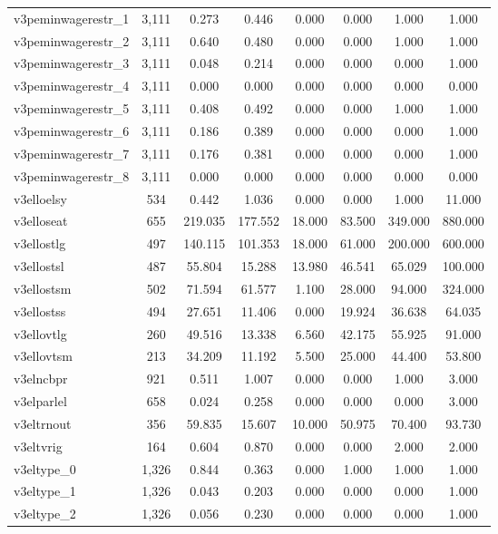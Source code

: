 \begin{table}[!htbp]
\begin{tabular}{@{\extracolsep{5pt}}lccccccc}
v3peminwagerestr\_1 & 3,111 & 0.273 & 0.446 & 0.000 & 0.000 & 1.000 & 1.000 \\ 
v3peminwagerestr\_2 & 3,111 & 0.640 & 0.480 & 0.000 & 0.000 & 1.000 & 1.000 \\ 
v3peminwagerestr\_3 & 3,111 & 0.048 & 0.214 & 0.000 & 0.000 & 0.000 & 1.000 \\ 
v3peminwagerestr\_4 & 3,111 & 0.000 & 0.000 & 0.000 & 0.000 & 0.000 & 0.000 \\ 
v3peminwagerestr\_5 & 3,111 & 0.408 & 0.492 & 0.000 & 0.000 & 1.000 & 1.000 \\ 
v3peminwagerestr\_6 & 3,111 & 0.186 & 0.389 & 0.000 & 0.000 & 0.000 & 1.000 \\ 
v3peminwagerestr\_7 & 3,111 & 0.176 & 0.381 & 0.000 & 0.000 & 0.000 & 1.000 \\ 
v3peminwagerestr\_8 & 3,111 & 0.000 & 0.000 & 0.000 & 0.000 & 0.000 & 0.000 \\ 
v3elloelsy & 534 & 0.442 & 1.036 & 0.000 & 0.000 & 1.000 & 11.000 \\ 
v3elloseat & 655 & 219.035 & 177.552 & 18.000 & 83.500 & 349.000 & 880.000 \\ 
v3ellostlg & 497 & 140.115 & 101.353 & 18.000 & 61.000 & 200.000 & 600.000 \\ 
v3ellostsl & 487 & 55.804 & 15.288 & 13.980 & 46.541 & 65.029 & 100.000 \\ 
v3ellostsm & 502 & 71.594 & 61.577 & 1.100 & 28.000 & 94.000 & 324.000 \\ 
v3ellostss & 494 & 27.651 & 11.406 & 0.000 & 19.924 & 36.638 & 64.035 \\ 
v3ellovtlg & 260 & 49.516 & 13.338 & 6.560 & 42.175 & 55.925 & 91.000 \\ 
v3ellovtsm & 213 & 34.209 & 11.192 & 5.500 & 25.000 & 44.400 & 53.800 \\ 
v3elncbpr & 921 & 0.511 & 1.007 & 0.000 & 0.000 & 1.000 & 3.000 \\ 
v3elparlel & 658 & 0.024 & 0.258 & 0.000 & 0.000 & 0.000 & 3.000 \\ 
v3eltrnout & 356 & 59.835 & 15.607 & 10.000 & 50.975 & 70.400 & 93.730 \\ 
v3eltvrig & 164 & 0.604 & 0.870 & 0.000 & 0.000 & 2.000 & 2.000 \\ 
v3eltype\_0 & 1,326 & 0.844 & 0.363 & 0.000 & 1.000 & 1.000 & 1.000 \\ 
v3eltype\_1 & 1,326 & 0.043 & 0.203 & 0.000 & 0.000 & 0.000 & 1.000 \\ 
v3eltype\_2 & 1,326 & 0.056 & 0.230 & 0.000 & 0.000 & 0.000 & 1.000 \\ 

\end{tabular}
\end{table}
